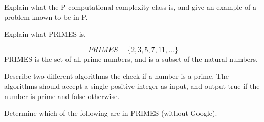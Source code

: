 \documentclass[addpoints,12pt]{exam}
\begin{document}
\begin{questions}
\begin{solution}
\end{solution}


\question
Explain what the P computational complexity class is, and give an example of a problem known to be in P.


\question
Explain what PRIMES is.
\begin{solution}
  \[ PRIMES = \{2, 3, 5, 7, 11, \ldots \} \]
  PRIMES is the set of all prime numbers, and is a subset of the natural numbers.
\end{solution}


\question
Describe two different algorithms the check if a number is a prime.
The algorithms should accept a single positive integer as input, and output true if the number is prime and false otherwise.


\question
Determine which of the following are in PRIMES (without Google).
\end{questions}
\end{document}
